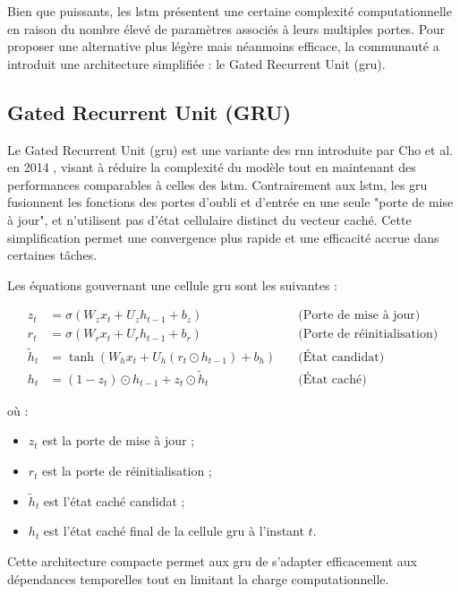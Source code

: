 \documentclass[12pt]{report}
\begin{document}
\bigskip

\noindent Bien que puissants, les \gls{lstm} présentent une certaine complexité computationnelle en raison du nombre élevé de paramètres associés à leurs multiples portes. Pour proposer une alternative plus légère mais néanmoins efficace, la communauté a introduit une architecture simplifiée : le Gated Recurrent Unit (\gls{gru}).

\subsection{Gated Recurrent Unit (GRU)}

Le Gated Recurrent Unit (\gls{gru}) est une variante des \gls{rnn} introduite par Cho et al. en 2014 \cite{cho2014learning}, visant à réduire la complexité du modèle tout en maintenant des performances comparables à celles des \gls{lstm}. Contrairement aux \gls{lstm}, les \gls{gru} fusionnent les fonctions des portes d’oubli et d’entrée en une seule "porte de mise à jour", et n’utilisent pas d’état cellulaire distinct du vecteur caché. Cette simplification permet une convergence plus rapide et une efficacité accrue dans certaines tâches.

Les équations gouvernant une cellule \gls{gru} sont les suivantes :

\begin{align*}
z_t &= \sigma(W_z x_t + U_z h_{t-1} + b_z) \quad &\text{(Porte de mise à jour)} \\
r_t &= \sigma(W_r x_t + U_r h_{t-1} + b_r) \quad &\text{(Porte de réinitialisation)} \\
\tilde{h}_t &= \tanh(W_h x_t + U_h (r_t \odot h_{t-1}) + b_h) \quad &\text{(État candidat)} \\
h_t &= (1 - z_t) \odot h_{t-1} + z_t \odot \tilde{h}_t \quad &\text{(État caché)}
\end{align*}

où :
\begin{itemize}
    \item \( z_t \) est la porte de mise à jour ;
    \item \( r_t \) est la porte de réinitialisation ;
    \item \( \tilde{h}_t \) est l’état caché candidat ;
    \item \( h_t \) est l’état caché final de la cellule \gls{gru} à l’instant \( t \).
\end{itemize}

Cette architecture compacte permet aux \gls{gru} de s’adapter efficacement aux dépendances temporelles tout en limitant la charge computationnelle.
\end{document}
